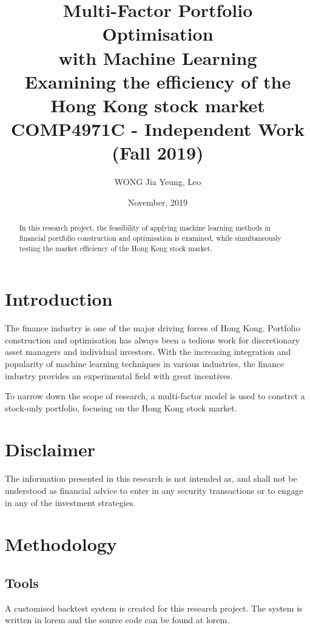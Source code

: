 \documentclass[12pt]{article}
\title{Multi-Factor Portfolio Optimisation \\ with Machine Learning \\[2ex]
  \large Examining the efficiency of the Hong Kong stock market \\[4ex]
  \large COMP4971C - Independent Work (Fall 2019)}
\author{WONG Jia Yeung, Leo}
\date{November, 2019}
\begin{document}
\begin{titlingpage}
  \maketitle
  \begin{abstract}
    In this research project, the feasibility of applying machine learning methods in financial portfolio construction and optimisation is examined, while simultaneously testing the market efficiency of the Hong Kong stock market.
  \end{abstract}
\end{titlingpage}


\tableofcontents

\section{Introduction}

The finance industry is one of the major driving forces of Hong Kong. Portfolio construction and optimisation has always been a tedious work for discretionary asset managers and individual investors. With the increasing integration and popularity of machine learning techniques in various industries, the finance industry provides an experimental field with great incentives.

To narrow down the scope of research, a multi-factor model is used to constrct a stock-only portfolio, focusing on the Hong Kong stock market.

\section{Disclaimer}

The information presented in this research is not intended as, and shall not be understood as financial advice to enter in any security transactions or to engage in any of the investment strategies.

\section{Methodology}

\subsection{Tools}

A customised backtest system is created for this research project. The system is written in lorem and the source code can be found at lorem.
\end{document}
